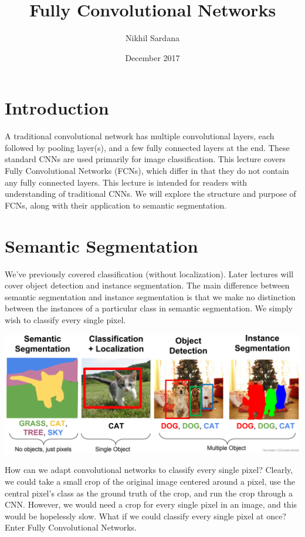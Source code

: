 \documentclass{article}
\title{Fully Convolutional Networks}
\author{Nikhil Sardana}
\date{December 2017}
\begin{document}
\maketitle

\section{Introduction}
A traditional convolutional network has multiple convolutional layers, each followed by pooling layer(s), and a few fully connected layers at the end. These standard CNNs are used primarily for image classification. This lecture covers Fully Convolutional Networks (FCNs), which differ in that they do not contain any fully connected layers. This lecture is intended for readers with understanding of traditional CNNs. We will explore the structure and purpose of FCNs, along with their application to semantic segmentation.


\section{Semantic Segmentation}

We've previously covered classification (without localization). Later lectures will cover object detection and instance segmentation. The main difference between semantic segmentation and instance segmentation is that we make no distinction between the instances of a particular class in semantic segmentation. We simply wish to classify every single pixel.

\begin{center}
\includegraphics[scale=0.3]{tasks.PNG}
\end{center}

How can we adapt convolutional networks to classify every single pixel? Clearly, we could take a small crop of the original image centered around a pixel, use the central pixel's class as the ground truth of the crop, and run the crop through a CNN. However, we would need a crop for every single pixel in an image, and this would be hopelessly slow. What if we could classify every single pixel at once? Enter Fully Convolutional Networks.
\end{document}
